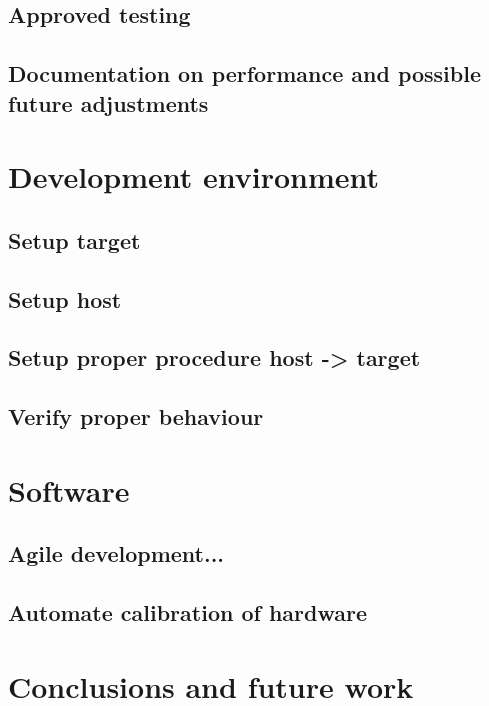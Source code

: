 \documentclass[12pt]{article}
\begin{document}
	\subsection{Approved testing}
	\subsection{Documentation on performance and possible future adjustments}
\section{Development environment}
	\subsection{Setup target}
	\subsection{Setup host}
	\subsection{Setup proper procedure host -> target}
	\subsection{Verify proper behaviour}
\section{Software}
	\subsection{Agile development...}
	\subsection{Automate calibration of hardware}

\section{Conclusions and future work}
\end{document}
